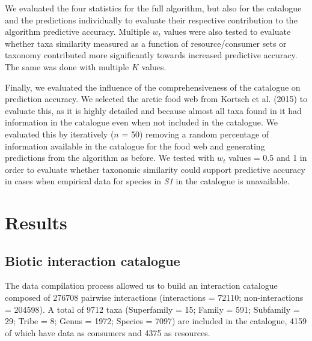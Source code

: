 \documentclass[letterpaper]{article}
\begin{document}
We evaluated the four statistics for the full algorithm, but also for the catalogue and the predictions individually to evaluate their respective contribution to the algorithm predictive accuracy. Multiple $w_t$ values were also tested to evaluate whether taxa similarity measured as a function of resource/consumer sets or taxonomy contributed more significantly towards increased predictive accuracy. The same was done with multiple $K$ values.

Finally, we evaluated the influence of the comprehensiveness of the catalogue on prediction accuracy. We selected the arctic food web from Kortsch et al. (2015) to evaluate this, as it is highly detailed and because almost all taxa found in it had information in the catalogue even when not included in the catalogue. We evaluated this by iteratively ($n$ = 50) removing a random percentage of information available in the catalogue for the food web and generating predictions from the algorithm as before. We tested with $w_t$ values = 0.5 and 1 in order to evaluate whether taxonomic similarity could support predictive accuracy in cases when empirical data for species in \textit{S1} in the catalogue is unavailable.


\section{Results}
    \subsection{Biotic interaction catalogue}
The data compilation process allowed us to build an interaction catalogue composed of 276708 pairwise interactions (interactions = 72110; non-interactions = 204598). A total of 9712 taxa (Superfamily = 15; Family = 591; Subfamily = 29; Tribe = 8; Genus = 1972; Species = 7097) are included in the catalogue, 4159 of which have data as consumers and 4375 as resources.
\end{document}
